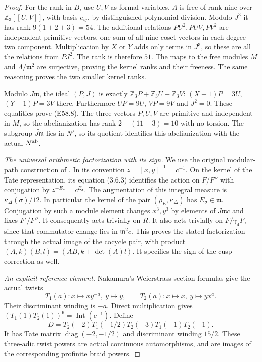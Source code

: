 \begin{proof}
For the rank in $B$, use $U,V$ as formal variables.
$\Lambda$ is free of rank nine over $\mathbb Z_3[[U,V]]$,
with basis $e_{ij}$, by distinguished-polynomial division.
Modulo $J^3$ it has rank $9(1+2+3)=54$.
The additional relations $PU^2,PUV,PV^2$ are independent
primitive vectors, one sum of all nine coset vectors in each
degree-two component. Multiplication by $X$ or $Y$ adds only
terms in $J^3$, so these are all the relations from $PJ^2$.
The rank is therefore $51$. The maps to the free modules
$M$ and $\Lambda/\mathfrak m^2$ are surjective, proving the
kernel ranks and their freeness. The same reasoning proves
the two smaller kernel ranks.

Modulo $J\mathfrak m$, the ideal $(P,J)$ is exactly
$\mathbb Z_3P+\mathbb Z_3U+\mathbb Z_3V$:
$(X-1)P=3U$, $(Y-1)P=3V$ there.
Furthermore $UP=9U$, $VP=9V$ and $J^2=0$.
These equalities prove (E58.8).
The three vectors $P,U,V$ are primitive and independent in
$M$, so the abelianization has rank $2+(11-3)=10$ with no
torsion. The subgroup $\widetilde{J\mathfrak m}$ lies in $N'$,
so its quotient identifies this abelianization with the actual
$N^{\rm ab}$.

\emph{The universal arithmetic factorization with its sign.}
We use the original modular-path construction of
\cite[\S\S3.6,5.9 and Theorem 6.10.3]{A_Nakamura2013}.
In its convention $z=[x,y]^{-1}=c^{-1}$.
On the kernel of the Tate representation, its equation (3.6.3)
identifies the action on $F/F''$ with conjugation by
$z^{-E_\sigma}=c^{E_\sigma}$.
The augmentation of this integral measure is
$\kappa_\Delta(\sigma)/12$.
In particular the kernel of the pair $(\rho_E,\kappa_\Delta)$
has $E_\sigma\in\mathfrak m$.
Conjugation by such a module element changes $x^3,y^3$ by
elements of $J\mathfrak m c$ and fixes $F'/F''$.
It consequently acts trivially on $R$.
It also acts trivially on $F/\gamma_4F$, since that commutator
change lies in $\mathfrak m^2c$.
This proves the stated factorization through the actual image
of the cocycle pair, with product
$(A,k)(B,l)=(AB,k+\det(A)l)$.
It specifies the sign of the cusp correction as well.

\emph{An explicit reference element.}
Nakamura's Weierstrass-section formulas
\cite[Proposition 5.7.3]{A_Nakamura2013} give the actual twists
\[
 T_1(a):x\mapsto xy^{-a},\ y\mapsto y,
 \qquad T_2(a):x\mapsto x,\ y\mapsto yx^a.
 \tag{E58.19}
\]
Their discriminant winding is $-a$. Direct multiplication gives
$(T_1(1)T_2(1))^6=\operatorname{Int}(c^{-1})$.
Define
\[
 D=T_2(-2)T_1(-1/2)T_2(-3)T_1(-1)T_2(-1).
 \tag{E58.20}
\]
It has Tate matrix $\operatorname{diag}(-2,-1/2)$ and
discriminant winding $15/2$.
These three-adic twist powers are actual continuous
automorphisms, and are images of the corresponding profinite
braid powers.


\end{proof}
